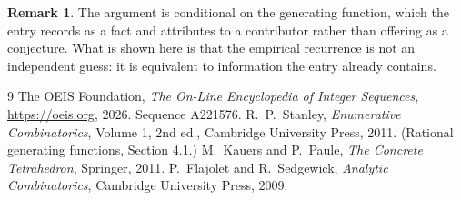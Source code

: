 \documentclass[11pt,a4paper]{article}
\theoremstyle{plain}
\theoremstyle{definition}
\newtheorem{remark}[theorem]{Remark}
\begin{document}
\begin{remark}
The argument is conditional on the generating function, which the entry records as a fact and
attributes to a contributor rather than offering as a conjecture. What is shown here is that
the empirical recurrence is not an independent guess: it is equivalent to information the
entry already contains.
\end{remark}

\begin{thebibliography}{9}
 The OEIS Foundation, \emph{The On-Line Encyclopedia of Integer
Sequences}, \url{https://oeis.org}, 2026. Sequence A221576.
 R.~P.~Stanley, \emph{Enumerative Combinatorics}, Volume 1, 2nd ed.,
Cambridge University Press, 2011. (Rational generating functions, Section 4.1.)
 M.~Kauers and P.~Paule, \emph{The Concrete Tetrahedron}, Springer, 2011.
 P.~Flajolet and R.~Sedgewick, \emph{Analytic Combinatorics}, Cambridge
University Press, 2009.
\end{thebibliography}
\end{document}
